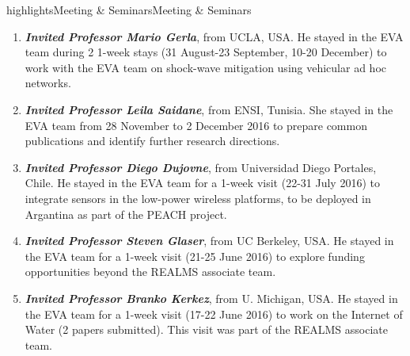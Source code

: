 \documentclass{ra2016}
\begin{document}
\begin{module}{highlights}{Meeting \& Seminars}{Meeting \& Seminars}
\begin{enumerate}
    \item \textit{\textbf{Invited Professor Mario Gerla}}, from UCLA, USA.
        He stayed in the EVA team during 2 1-week stays (31 August-23 September, 10-20 December) to work with the EVA team on shock-wave mitigation using vehicular ad hoc networks.
    \item \textit{\textbf{Invited Professor Leila Saidane}}, from ENSI, Tunisia.
        She stayed in the EVA team from 28 November to 2 December 2016 to prepare common publications and identify further research directions.
    \item \textit{\textbf{Invited Professor Diego Dujovne}}, from Universidad Diego Portales, Chile.
        He stayed in the EVA team for a 1-week visit (22-31 July 2016) to integrate sensors in the low-power wireless platforms, to be deployed in Argantina as part of the PEACH project.
    \item \textit{\textbf{Invited Professor Steven Glaser}}, from UC Berkeley, USA.
        He stayed in the EVA team for a 1-week visit (21-25 June 2016) to explore funding opportunities beyond the REALMS associate team.
    \item \textit{\textbf{Invited Professor Branko Kerkez}}, from U. Michigan, USA.
        He stayed in the EVA team for a 1-week visit (17-22 June 2016) to work on the Internet of Water (2 papers submitted).
        This visit was part of the REALMS associate team.
\end{enumerate} 

\end{module}

\end{document}

